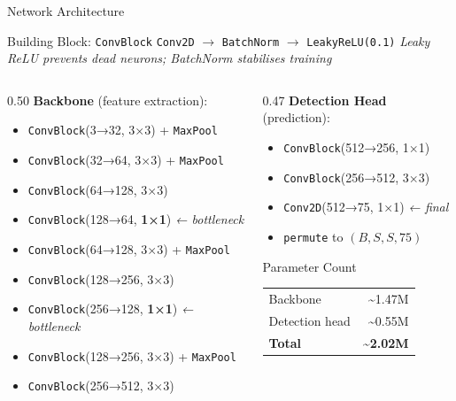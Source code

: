\documentclass[aspectratio=169, 10pt]{beamer}
\begin{document}
\begin{frame}{Network Architecture}
\begin{block}{Building Block: \texttt{ConvBlock}}
  \texttt{Conv2D} $\rightarrow$ \texttt{BatchNorm} $\rightarrow$ \texttt{LeakyReLU(0.1)}
  \hfill \textit{Leaky ReLU prevents dead neurons; BatchNorm stabilises training}
\end{block}

\vspace{0.1cm}
\begin{columns}[T]
\begin{column}{0.50\textwidth}
  \textbf{Backbone} (feature extraction):
  \begin{itemize}
    \item \texttt{ConvBlock}(3→32, 3×3) + \texttt{MaxPool}
    \item \texttt{ConvBlock}(32→64, 3×3) + \texttt{MaxPool}
    \item \texttt{ConvBlock}(64→128, 3×3)
    \item \texttt{ConvBlock}(128→64, \textbf{1×1}) \textit{← bottleneck}
    \item \texttt{ConvBlock}(64→128, 3×3) + \texttt{MaxPool}
    \item \texttt{ConvBlock}(128→256, 3×3)
    \item \texttt{ConvBlock}(256→128, \textbf{1×1}) \textit{← bottleneck}
    \item \texttt{ConvBlock}(128→256, 3×3) + \texttt{MaxPool}
    \item \texttt{ConvBlock}(256→512, 3×3)
  \end{itemize}
\end{column}
\begin{column}{0.47\textwidth}
  \textbf{Detection Head} (prediction):
  \begin{itemize}
    \item \texttt{ConvBlock}(512→256, 1×1)
    \item \texttt{ConvBlock}(256→512, 3×3)
    \item \texttt{Conv2D}(512→75, 1×1) \textit{← final}
    \item \texttt{permute} to $(B, S, S, 75)$
  \end{itemize}

  \begin{block}{Parameter Count}
    \begin{tabular}{lr}
      Backbone        & \textasciitilde1.47M \\
      Detection head  & \textasciitilde0.55M \\
      \midrule
      \textbf{Total}  & \textbf{\textasciitilde2.02M} \\
    \end{tabular}
  \end{block}
\end{column}
\end{columns}
\end{frame}
\end{document}
